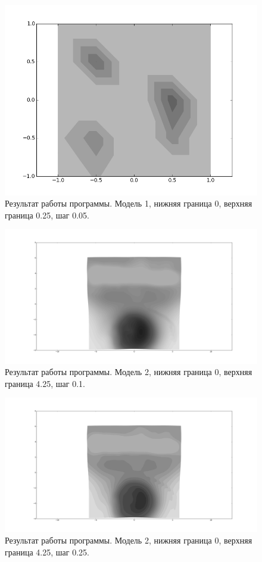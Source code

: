\documentclass[12pt,a4paper,oneside]{extarticle}
\begin{document}
    \begin{figure}[h!]
        \center
        \includegraphics[scale=0.5]{mini3.png}
        \caption{Результат работы программы. Модель 1, нижняя граница 0, верхняя граница 0.25, шаг 0.05.}
        \label{pic:mini3}
    \end{figure}

    \begin{figure}[h!]
        \center
        \includegraphics[scale=0.25]{big1.png}
        \caption{Результат работы программы. Модель 2, нижняя граница 0, верхняя граница 4.25, шаг 0.1.}
        \label{pic:big1}
    \end{figure}

    \begin{figure}[h!]
        \center
        \includegraphics[scale=0.25]{big2.png}
        \caption{Результат работы программы. Модель 2, нижняя граница 0, верхняя граница 4.25, шаг 0.25.}
        \label{pic:big2}
    \end{figure}
\end{document}
